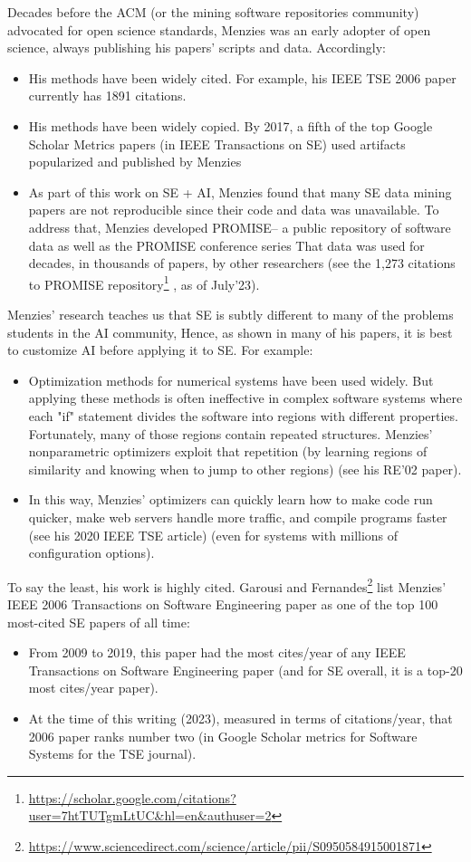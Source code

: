 \documentclass[10pt]{article}
\begin{document}
Decades before the ACM (or the mining software repositories community) advocated for open science standards, Menzies was an early adopter of open science, always publishing his papers’ scripts and data. Accordingly:
\begin{itemize}
    \item  
 His methods have been widely cited. For example, his IEEE TSE 2006 paper currently has 1891 citations.
\item His methods have been widely copied. By 2017, a fifth of the top Google Scholar Metrics papers (in IEEE Transactions on SE) used artifacts popularized and published by Menzies 
\item As part of this work on SE + AI, Menzies found that many SE data mining papers are not reproducible since their code and data was unavailable. To address that, Menzies developed PROMISE-- a public repository of software data as well as the PROMISE conference series That data was used for decades, in thousands of papers, by other researchers (see the 1,273 citations to  PROMISE repository\footnote{
\url{https://scholar.google.com/citations?user=7htTUTgmLtUC&hl=en&authuser=2}
} , as of July’23).
\end{itemize}


Menzies’ research teaches us that SE is subtly different to many of the problems students in the AI community, Hence, as shown in many of his papers, it is best to customize AI before applying it to SE. For example:
\begin{itemize}
    \item  
Optimization methods for numerical systems have been used widely. But applying these methods is often ineffective in complex software systems where each "if" statement divides the software into regions with different properties. Fortunately, many of those regions contain repeated structures. Menzies’ nonparametric optimizers exploit that repetition (by learning regions of similarity and knowing when to jump to other regions)  (see his RE'02 paper).
\item 
In this way, Menzies’ optimizers can quickly learn how to make code run quicker, make web servers handle more traffic, and compile programs faster  (see his 2020 IEEE TSE article) (even for systems with millions of configuration options). 
\end{itemize}



 
To say the least, his work is highly cited.
Garousi and  Fernandes\footnote{\url{https://www.sciencedirect.com/science/article/pii/S0950584915001871}}  list Menzies' IEEE 2006 Transactions on Software Engineering paper as one of the top 100 most-cited SE papers of all time:
\begin{itemize}
\item
From  2009 to 2019, this paper had the most cites/year of any IEEE Transactions on Software Engineering paper (and for SE overall, it is a top-20 most cites/year paper).
\item At the time of this writing (2023), measured in terms of citations/year,   that 2006 paper   ranks number two (in Google Scholar metrics for Software Systems for the TSE journal). 
\end{itemize}  
\end{document}
